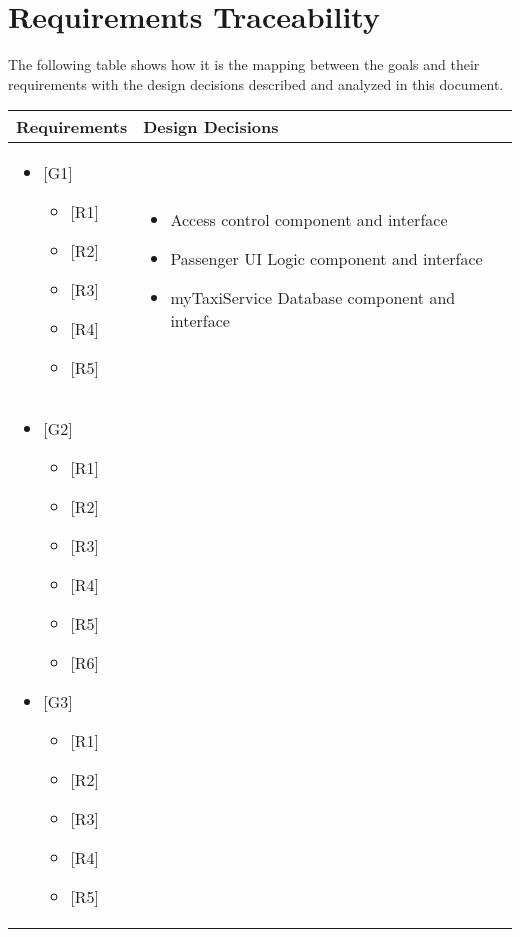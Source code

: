 \section{Requirements Traceability}
The following table shows how it is the mapping between the goals and their requirements with the design decisions described and analyzed in this document.
\begin{center}
\def\arraystretch{1.5}
\begin{longtable}{|p{}|p{}|}
	\hline
	Requirements & Design Decisions \\
	\hline\MPtrue
	\begin{itemize}
		\item {[}G1{]}
	\begin{itemize}
		\item {[}R1{]}
		\item {[}R2{]}
		\item {[}R3{]}
		\item {[}R4{]}
		\item {[}R5{]}
	\end{itemize}\end{itemize} & \MPtrue\begin{itemize}
	\item Access control component and interface
	\item Passenger UI Logic component and interface
	\item myTaxiService Database component and interface
	\end{itemize} \\
	\hline\MPtrue
	\begin{itemize}
		\item {[}G2{]}
	\begin{itemize}
		\item {[}R1{]}
		\item {[}R2{]}
		\item {[}R3{]}
		\item {[}R4{]}
		\item {[}R5{]}
		\item {[}R6{]}
	\end{itemize}
	\item {[}G3{]}
	\begin{itemize}
		\item {[}R1{]}
		\item {[}R2{]}
		\item {[}R3{]}
		\item {[}R4{]}
		\item {[}R5{]}

\end{itemize}
\end{itemize}
\end{longtable}
\end{center}
